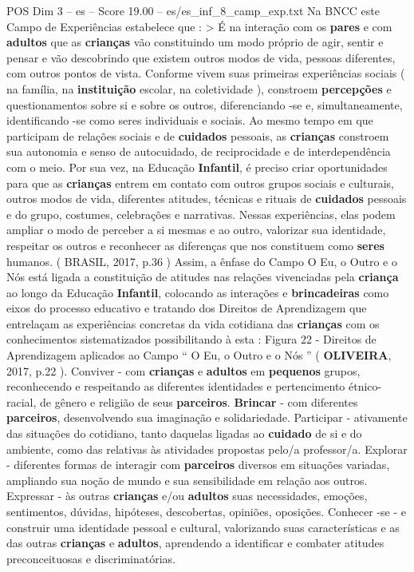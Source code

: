 \begin{textsample}{POS Dim 3 – es – Score 19.00 – es/es\_inf\_8\_camp\_exp.txt}
Na BNCC este Campo de Experiências estabelece que : > É na interação com os \textbf{pares} e com \textbf{adultos} que as \textbf{crianças} vão constituindo um modo próprio de agir, sentir e pensar e vão descobrindo que existem outros modos de vida, pessoas diferentes, com outros pontos de vista.
Conforme vivem suas primeiras experiências sociais ( na família, na \textbf{instituição} escolar, na coletividade ), constroem \textbf{percepções} e questionamentos sobre si e sobre os outros, diferenciando -se e, simultaneamente, identificando -se como seres individuais e sociais.
Ao mesmo tempo em que participam de relações sociais e de \textbf{cuidados} pessoais, as \textbf{crianças} constroem sua autonomia e senso de autocuidado, de reciprocidade e de interdependência com o meio.
Por sua vez, na Educação \textbf{Infantil}, é preciso criar oportunidades para que as \textbf{crianças} entrem em contato com outros grupos sociais e culturais, outros modos de vida, diferentes atitudes, técnicas e rituais de \textbf{cuidados} pessoais e do grupo, costumes, celebrações e narrativas.
Nessas experiências, elas podem ampliar o modo de perceber a si mesmas e ao outro, valorizar sua identidade, respeitar os outros e reconhecer as diferenças que nos constituem como \textbf{seres} humanos. ( BRASIL, 2017, p.36 ) Assim, a ênfase do Campo O Eu, o Outro e o Nós está ligada a constituição de atitudes nas relações vivenciadas pela \textbf{criança} ao longo da Educação \textbf{Infantil}, colocando as interações e \textbf{brincadeiras} como eixos do processo educativo e tratando dos Direitos de Aprendizagem que entrelaçam as experiências concretas da vida cotidiana das \textbf{crianças} com os conhecimentos sistematizados possibilitando à esta : Figura 22 - Direitos de Aprendizagem aplicados ao Campo “ O Eu, o Outro e o Nós ” ( \textbf{OLIVEIRA}, 2017, p.22 ).
Conviver - com \textbf{crianças} e \textbf{adultos} em \textbf{pequenos} grupos, reconhecendo e respeitando as diferentes identidades e pertencimento étnico-racial, de gênero e religião de seus \textbf{parceiros}. \textbf{Brincar} - com diferentes \textbf{parceiros}, desenvolvendo sua imaginação e solidariedade.
Participar - ativamente das situações do cotidiano, tanto daquelas ligadas ao \textbf{cuidado} de si e do ambiente, como das relativas às atividades propostas pelo/a professor/a.
Explorar - diferentes formas de interagir com \textbf{parceiros} diversos em situações variadas, ampliando sua noção de mundo e sua sensibilidade em relação aos outros.
Expressar - às outras \textbf{crianças} e/ou \textbf{adultos} suas necessidades, emoções, sentimentos, dúvidas, hipóteses, descobertas, opiniões, oposições.
Conhecer -se - e construir uma identidade pessoal e cultural, valorizando suas características e as das outras \textbf{crianças} e \textbf{adultos}, aprendendo a identificar e combater atitudes preconceituosas e discriminatórias.

\end{textsample}
